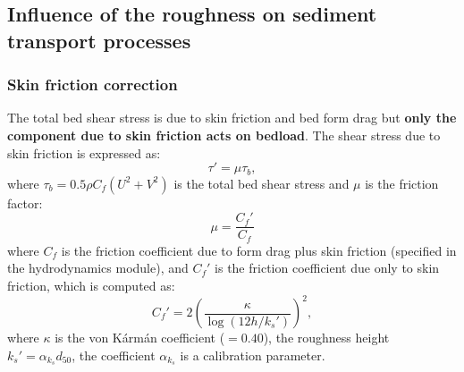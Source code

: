 \subsection{Influence of the roughness on sediment transport processes}\label{sec:roug}
\subsubsection{Skin friction correction}\label{sec:skin}
The total bed shear stress is due to skin friction and bed form drag but \textbf{only the component due to skin friction acts on bedload}. The shear stress due to skin friction is expressed as:
\begin{equation}\label{eq:taup}
\tau'=\mu\tau_b,
\end{equation}
where $\tau_b = 0.5 \rho C_f (U^2 + V^2)$ is the total bed shear stress and $\mu$ is the friction factor:
\begin{equation}\label{eq:mu}
\mu=\frac{C_f'}{C_f}
\end{equation}
where $C_f$ is the friction coefficient due to form drag plus skin friction (specified in the hydrodynamics module), and $C_f'$ is the friction coefficient due only to skin friction, which is computed as:
\begin{equation}\label{eq:cfp}
C_f'=2\left(\frac{\kappa}{\log(12h/k_s')}\right)^2,
\end{equation}
where $\kappa$ is the von K\'arm\'an coefficient ($=0.40$), the roughness height $k_s'=\alpha_{k_s}d_{50}$, the coefficient $\alpha_{k_s}$ is a calibration parameter.

